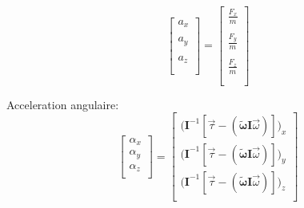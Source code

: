 \documentclass{article}
\begin{document}
\begin{equation}
    \begin{bmatrix}
        a_x \\ \\
        a_y \\ \\
        a_z \\ \\
    \end{bmatrix}
=
\begin{bmatrix}
    \frac{F_x}{m} \\ \\
    \frac{F_y}{m} \\ \\
    \frac{F_z}{m} \\ \\
\end{bmatrix}
\end{equation}

Acceleration angulaire:
\begin{equation}
    \begin{bmatrix}
        \alpha_x \\
        \alpha_y \\
        \alpha_z \\
    \end{bmatrix}
=
\begin{bmatrix}
    \lparen\boldsymbol{I}^{-1}[\vec{\tau} - (\boldsymbol{\tilde{\omega}}\boldsymbol{I}\vec{\omega})]\rparen_x \\
    \lparen\boldsymbol{I}^{-1}[\vec{\tau} - (\boldsymbol{\tilde{\omega}}\boldsymbol{I}\vec{\omega})]\rparen_y \\
    \lparen\boldsymbol{I}^{-1}[\vec{\tau} - (\boldsymbol{\tilde{\omega}}\boldsymbol{I}\vec{\omega})]\rparen_z \\
\end{bmatrix}
\end{equation}
\end{document}
